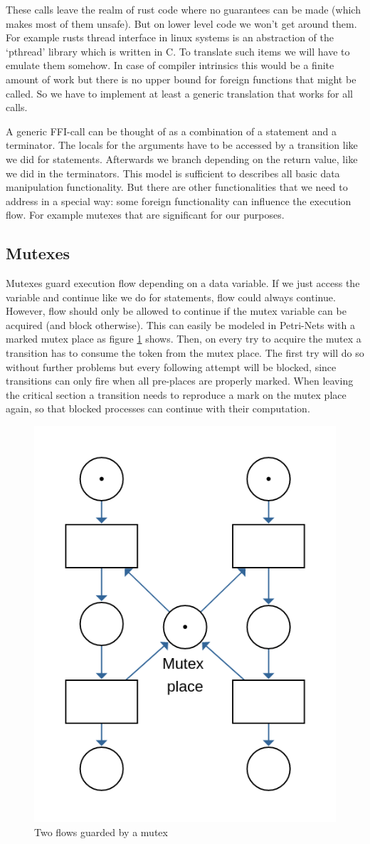 These calls leave the realm of rust code where no guarantees can be made (which makes most of them unsafe).
But on lower level code we won't get around them.
For example rusts thread interface in linux systems is an abstraction of the `pthread' library which is written in C.
To translate such items we will have to emulate them somehow.
In case of compiler intrinsics this would be a finite amount of work but there is no upper bound for foreign functions that might be called.
So we have to implement at least a generic translation that works for all calls.

A generic FFI-call can be thought of as a combination of a statement and a terminator.
The locals for the arguments have to be accessed by a transition like we did for statements.
Afterwards we branch depending on the return value, like we did in the terminators.
This model is sufficient to describes all basic data manipulation functionality.
But there are other functionalities that we need to address in a special way:
some foreign functionality can influence the execution flow.
For example mutexes that are significant for our purposes.

\subsection*{Mutexes}
Mutexes guard execution flow depending on a data variable.
If we just access the variable and continue like we do for statements, flow could always continue.
However, flow should only be allowed to continue if the mutex variable can be acquired (and block otherwise).
This can easily be modeled in Petri-Nets with a marked mutex place as figure \ref{mutex_net} shows.
Then, on every try to acquire the mutex a transition has to consume the token from the mutex place.
The first try will do so without further problems but every following attempt will be blocked, since transitions can only fire when all pre-places are properly marked.
When leaving the critical section a transition needs to reproduce a mark on the mutex place again, so that blocked processes can continue with their computation.
\begin{figure}
    \centering
    \includegraphics[width=.4\textwidth]{../diagrams/mutexNet.png}
    \caption{Two flows guarded by a mutex}
    \label{mutex_net}
\end{figure}

